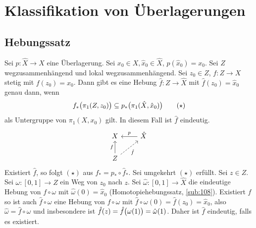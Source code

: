 \section{Klassifikation von Überlagerungen} %
\label{sec:13}

\subsection{Hebungssatz} %
\label{sub:131}
Sei $p: \hat{X} \to X$ eine Überlagerung. Sei $x_0 \in X, \hat{x}_0 \in \hat{X}$, $p(\hat{x}_0)= x_0$. Sei $Z$ wegzusammenhängend und lokal wegzusammenhängend. Sei 
$z_0 \in Z$, $f : Z \to X$ stetig mit $f(z_0)= x_0$. Dann gibt es eine Hebung $\hat{f} : Z \to \hat{X}$ mit $\hat{f} (z_0) = \hat{x}_0$ genau dann, wenn 
\[
	f_*\enbrace[\big]{\pi_1 (Z, z_0)} \subseteq  p_* \enbrace[\big]{\pi_1(\hat{X}, \hat{x}_0)} \tag*{$(\star)$}
\]
als Untergruppe von $\pi_1(X,x_0)$ gilt. In diesem Fall ist $\hat{f}$ eindeutig.
\[
	\begin{tikzcd}
		X & \hat{X} \lar[swap]{p} \\
		Z \uar{f}  \urar[dashed, swap]{\hat{f}}&
	\end{tikzcd}
\]
Existiert $\hat{f}$, so folgt $(\star)$ aus $f_* = p_* \circ\hat{f}_*$. Sei umgekehrt $(\star)$ erfüllt. Sei $z\in Z$. Sei $\omega : [0,1]\to Z$ ein Weg von $z_0$ nach $z$.
Sei $\hat{\omega} : [0,1] \to \hat{X}$ die eindeutige Hebung von $f \circ \omega$ mit $\hat{\omega}(0)= \hat{x}_0$ (Homotopiehebungssatz, \ref{sub:108}). Existiert 
$\hat{f}$ so ist auch $\hat{f} \circ \omega$ eine Hebung von $f \circ \omega$ mit $\hat{f} \circ \omega (0) = \hat{f}(z_0)= \hat{x}_0$, also 
$\hat{\omega} = \hat{f} \circ \omega$ und insbesondere ist $\hat{f}(z)= \hat{f} \enbrace[\big]{\omega(1)} = \hat{\omega}(1)$. Daher ist $\hat{f}$ eindeutig, falls es 
existiert.

